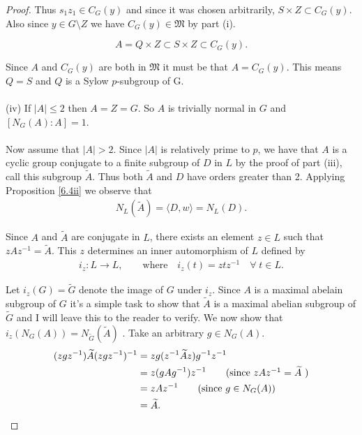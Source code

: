 \begin{proof}
Thus $s_1z_1 \in C_G(y)$ and since it was chosen arbitrarily, $S \times Z \subset C_G(y)$. Also since $y \in G \! \setminus \! Z$ we have $C_G(y) \in \mathfrak{M}$ by part (i).

\begin{equation*}
A = Q \times Z \subset S \times Z \subset C_G(y).
\end{equation*}

Since $A$ and $C_G(y)$ are both in $\mathfrak{M}$ it must be that $A = C_G(y)$. This means $Q = S$ and $Q$ is a Sylow $p$-subgroup of G.\\
\\
(iv) If $|A| \leq 2$ then $A=Z=G$. So $A$ is trivially normal in $G$ and $[N_G(A): A] = 1$. \\
\\
Now assume that $|A| > 2$. Since $|A|$ is relatively prime to $p$, we have that $A$ is a cyclic group conjugate to a finite subgroup of $D$ in $L$ by the proof of part (iii), call this subgroup ${\widetilde{A}}$. Thus both ${\widetilde{A}}$ and $D$ have orders greater than 2. Applying Proposition \ref{6.4ii} we observe that
\begin{align}\label{norm1}  N_L({\widetilde{A}}) = \langle D , w \rangle = N_L(D).
\end{align}

Since $A$ and ${\widetilde{A}}$ are conjugate in $L$, there exists an element $z \in L$ such that $zAz^{-1} = {\widetilde{A}}$. This $z$ determines an inner automorphism of $L$ defined by
\begin{align*} 
    i_z: L \longrightarrow L,  \qquad \text{where} \quad  i_z(t) = z t z^{-1}  \quad \forall \; t \in L.
\end{align*}

Let $i_z(G) = {\widetilde{G}}$ denote the image of $G$ under $i_z$. Since $A$ is a maximal abelain subgroup of $G$ it's a simple task to show that ${\widetilde{A}}$ is a maximal abelian subgroup of ${\widetilde{G}}$ and I will leave this to the reader to verify. We now show that $i_z(N_G(A)) = N_{\widetilde{G}}({\widetilde{A}})$ . Take an arbitrary $g \in N_G(A)$.
\begin{align*} (z g z^{-1}) {\widetilde{A}} (z g z^{-1})^{-1} &= z g (z^{-1} {\widetilde{A}} z) g^{-1} z^{-1}
\\ &=  z (g A g^{-1}) z^{-1} \tag{since $zAz^{-1} = {\widetilde{A}}$ }
\\ &= z A z^{-1} \tag{since $g \in N_G(A)$}
\\ &= {\widetilde{A}}.
\end{align*}


\end{proof}
